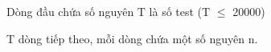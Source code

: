 Dòng đầu chứa số nguyên T là số test (T  $\le$  20000)  

   T dòng tiếp theo, mỗi dòng chứa một số nguyên n.  

\